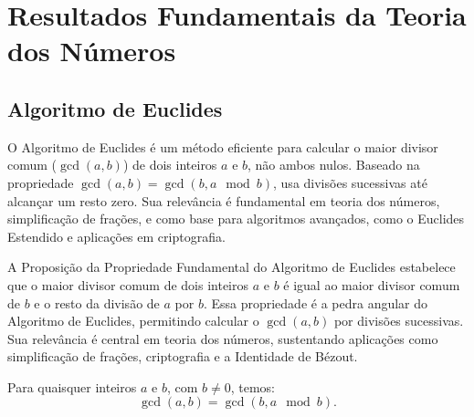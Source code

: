 \chapter{Resultados Fundamentais da Teoria dos Números}

\section{Algoritmo de Euclides}

O Algoritmo de Euclides é um método eficiente para calcular o maior divisor
comum ($\gcd(a, b)$) de dois inteiros $a$ e $b$, não ambos nulos. Baseado na
propriedade $\gcd(a, b) = \gcd(b, a \mod b)$, usa divisões sucessivas até
alcançar um resto zero. Sua relevância é fundamental em teoria dos números,
simplificação de frações, e como base para algoritmos avançados, como o
Euclides Estendido e aplicações em criptografia.

A Proposição da Propriedade Fundamental do Algoritmo de Euclides estabelece que
o maior divisor comum de dois inteiros $a$ e $b$ é igual ao maior divisor
comum de $b$ e o resto da divisão de $a$ por $b$. Essa propriedade é a
pedra angular do Algoritmo de Euclides, permitindo calcular o $\gcd(a, b)$
por divisões sucessivas. Sua relevância é central em teoria dos números,
sustentando aplicações como simplificação de frações, criptografia e a
Identidade de Bézout.

\begin{proposition}
Para quaisquer inteiros $a$ e $b$, com $b \neq 0$, temos:
\[
\gcd(a, b) = \gcd(b, a \mod b).
\]
\end{proposition}

